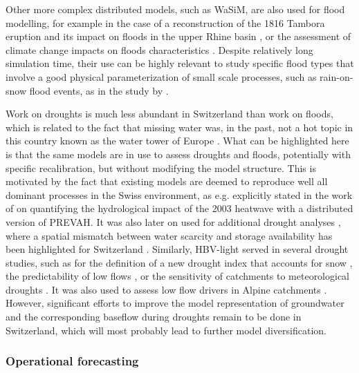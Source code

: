 \documentclass[10pt,a4paper]{article}
\begin{document}
Other more complex distributed models, such as WaSiM, are also used for flood modelling, for example in the case of a reconstruction of the 1816 Tambora eruption and its impact on floods in the upper Rhine basin \citep[see Fig. \ref{fig:map};][]{Rossler2018}, or the assessment of climate change impacts on floods characteristics \citep{Keller2019a}. Despite relatively long simulation time, their use can be highly relevant to study specific flood types that involve a good physical parameterization of small scale processes, such as rain-on-snow flood events, as in the study by \citet{Rossler2014}.

Work on droughts is much less abundant in Switzerland than work on floods, which is related to the fact that missing water was, in the past, not a hot topic in this country known as the water tower of Europe \citep{Milano2015}. What can be highlighted here is that the same models are in use to assess droughts and floods, potentially with specific recalibration, but without modifying the model structure. This is motivated by the fact that existing models are deemed to reproduce well all dominant processes in the Swiss environment, as e.g. explicitly stated in the work of \citet{Zappa2007a} on quantifying the hydrological impact of the 2003 heatwave with a distributed version of PREVAH. It was also later on used for additional drought analyses \citep{Brunner2019e, Zappa2019}, where a spatial mismatch between water scarcity and storage availability has been highlighted for Switzerland \citep{Brunner2019e}. Similarly, HBV-light served in several drought studies, such as for the definition of a new drought index that accounts for snow \citep{Staudinger2014}, the predictability of low flows \citep{Staudinger2014a}, or the sensitivity of catchments to meteorological droughts \citep{Staudinger2015}. It was also used to assess low flow drivers in Alpine catchments \citep{Arnoux_2020}. However, significant efforts to improve the model representation of groundwater and the corresponding baseflow during droughts remain to be done in Switzerland, which will most probably lead to further model diversification.


\subsubsection{Operational forecasting}
\label{sec:application:forecasting}
\end{document}
